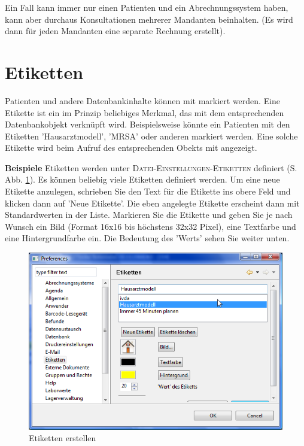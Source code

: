 Ein Fall kann immer nur einen Patienten und ein Abrechnungssystem haben, kann aber durchaus  Konsultationen mehrerer Mandanten beinhalten. (Es wird dann für jeden Mandanten eine separate Rechnung erstellt).

\section{Etiketten}
\label{Etiketten}
Patienten und andere Datenbankinhalte können mit  markiert werden. Eine Etikette ist ein im Prinzip beliebiges Merkmal, das mit dem entsprechenden Datenbankobjekt verknüpft wird. Beispielsweise könnte ein Patienten mit den Etiketten 'Hausarztmodell', 'MRSA' oder anderen markiert werden. Eine solche Etikette wird beim Aufruf des entsprechenden Obekts mit angezeigt.

\textbf{Beispiele}
Etiketten werden unter \textsc{Datei-Einstellungen-Etiketten} definiert (S. Abb. \ref{fig:etiketten1}). Es können beliebig viele Etiketten definiert werden. Um eine neue Etikette anzulegen, schrieben Sie den Text für die Etikette ins obere Feld und klicken dann auf 'Neue Etikette'. Die eben angelegte Etikette erscheint dann mit Standardwerten in der Liste. Markieren Sie die Etikette und geben Sie je nach Wunsch ein Bild (Format 16x16 bis höchstens 32x32 Pixel), eine Textfarbe und eine Hintergrundfarbe ein. Die Bedeutung des 'Werts' sehen Sie weiter unten.

\begin{figure}
    \includegraphics{images/etikette1}
    \caption{Etiketten erstellen}
    \label{fig:etiketten1}
\end{figure}

